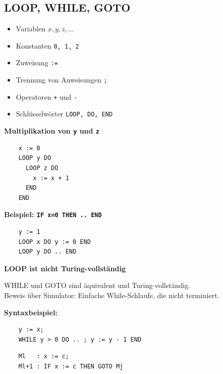 \documentclass[a4paper]{article}
\begin{document}
\subsection{LOOP, WHILE, GOTO}	
	\begin{fmerke}[LOOP]
	\begin{multicols}{3}
	\begin{itemize}
		\item Variablen $x, y, z, \dots$
		\item Konstanten \texttt{0, 1, 2}
		\item Zuweisung \texttt{:=}
		\item Trennung von Anweisungen \texttt{;}
		\item Operatoren \texttt{+} und \texttt{-}
		\item Schlüsselwörter \texttt{LOOP, DO, END}
	\end{itemize}
	
	\columnbreak	
	
	\textbf{Multiplikation von \verb"y" und \verb"z"}
	\begin{verbatim}
	x := 0
	LOOP y DO
	  LOOP z DO
	    x := x + 1
	  END
	END
	\end{verbatim}

	\columnbreak	
	
	\textbf{Beispiel: \verb"IF x=0 THEN .. END"}
	\begin{verbatim}
	y := 1
	LOOP x DO y := 0 END
	LOOP y DO .. END
	\end{verbatim}
	
	\end{multicols}
	\end{fmerke}	
	
	\textbf{LOOP ist nicht Turing-vollständig}
	
	\begin{fmerke}
	\begin{multicols}{2}
	WHILE und GOTO sind äquivalent und Turing-vollständig. \\
	Beweis über Simulator: Einfache While-Schlaufe, die nicht terminiert.
	
	\columnbreak
	\textbf{Syntaxbeispiel:}
	
	\begin{verbatim}
	y := x;
	WHILE y > 0 DO .. ; y := y - 1 END
	\end{verbatim}
	
	\begin{verbatim}
	Ml   : x := c;
	Ml+1 : IF x := c THEN GOTO Mj
	\end{verbatim}
	\end{multicols}
	\end{fmerke}
\end{document}
